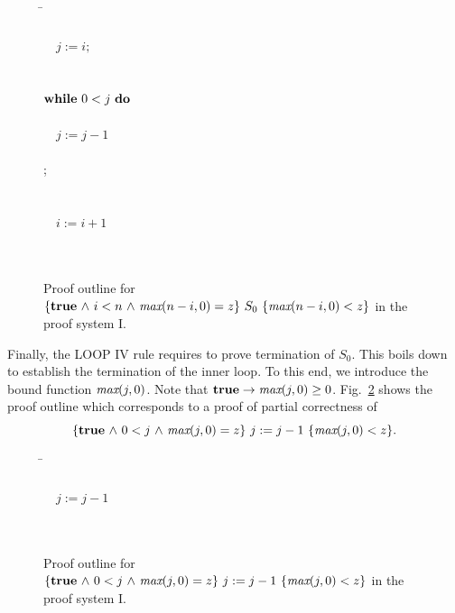 \documentclass[manuscript, screen, review]{acmart}
\begin{document}
 \begin{figure}[ht]
 \begin{tabbing}
 \qquad\qquad                                       
\=   \\
\>                           \\
\>  \ \ $j:=i; $                                \\
\>                            \\
\>             \\
\>  $\mbox{$\mbox{{\bf while}\ } {0 < j}\ \mbox{{\bf do}\ }$}$                          \\
\>  \qquad {}                  \\
\>  \qquad \ \ $j:=j-1$                         \\
\> \qquad {}                    \\
\>  \OD ;                                       \\
\>            \\
\>                       \\
\>  \ \ $i:=i+1$                                \\
\>                            \\
\>                \\
[\bigskipamount]
\end{tabbing}
\caption{Proof outline for $\mbox{$\{{\mbox{{\bf true}}\mbox{$\ \wedge\ $} i < n \mbox{$\ \wedge\ $} \mbox{\it max}(n-i,0) = z}\}\ {S_0}\ \{{\mbox{\it max}(n-i,0) < z}\}$}$  in the proof system I.}
\label{fig:po2}

\end{figure}

Finally, the LOOP IV rule requires to prove termination of $S_0$.
This boils down to establish the termination of the inner loop.
To this end, we introduce
the bound function $\mbox{\it max}(j,0)$.
Note that $\mbox{{\bf true}}\to \mbox{\it max}(j,0)\geq 0$. 
Fig.~\ref{fig:po3} shows the proof outline
which corresponds to a proof of  partial correctness of
$$\mbox{$\{{\mbox{{\bf true}}\mbox{$\ \wedge\ $} 0<j\mbox{$\ \wedge\ $}  \mbox{\it max}(j,0)= z}\}\ {j:=j-1}\ \{{\mbox{\it max}(j,0) < z}\}$}.$$

 \begin{figure}[htbp]
 \begin{tabbing}
 \qquad\qquad    
\=       \\
\>                          \\
\>  \ \ $j:=j-1$                               \\
\>                             \\
\>                 \\
\end{tabbing}
\caption{Proof outline for $\mbox{$\{{\mbox{{\bf true}}\mbox{$\ \wedge\ $} 0<j\mbox{$\ \wedge\ $}  \mbox{\it max}(j,0)= z}\}\ {j:=j-1}\ \{{\mbox{\it max}(j,0) < z}\}$}$  in the proof system I.}
\label{fig:po3}

\end{figure}
\end{document}
